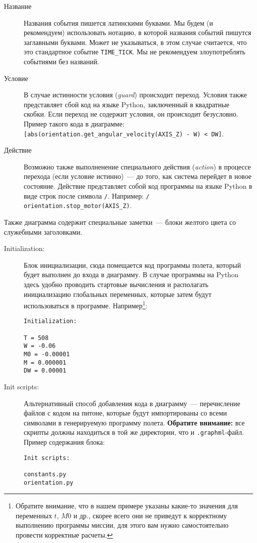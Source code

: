 \documentclass[12pt,a4paper]{article}
\begin{document}
\begin{description}
\item[Название] Названия события пишется латинскими буквами. Мы будем (и рекомендуем)
  использовать нотацию, в которой названия событий пишутся заглавными буквами. Может не
  указываться, в этом случае считается, что это стандартное событие \verb'TIME_TICK'. Мы
  не рекомендуем злоупотреблять событиями без названий.
\item[Условие] В случае истинности условия (\emph{guard}) происходит переход. Условия
  также представляет сбой код на языке Python, заключенный в квадратные скобки. Если
  переход не содержит условия, он происходит безусловно. Пример такого кода в диаграмме:
  \verb'[abs(orientation.get_angular_velocity(AXIS_Z) - W) < DW]'.
\item[Действие] Возможно также выполненение специального действия (\emph{action}) в
  процессе перехода (если условие истинно)~--- до того, как система перейдет в новое
  состояние. Действие представляет собой код программы на языке Python в виде строк после
  символа \verb'/'. Например: \verb'/ orientation.stop_motor(AXIS_Z)'.
\end{description}

Также диаграмма содержит специальные заметки~--- блоки желтого цвета со служебными
заголовками.

\begin{description}
\item[Initialization:] Блок инициализации, сюда помещается код программы полета,
  который будет выполнен до входа в диаграмму. В случае программы на Python здесь удобно
  проводить стартовые вычисления и располагать инициализацию глобальных переменных,
  которые затем будут использоваться в программе. Например\footnote{Обратите внимание, что в нашем
    примере указаны какие-то значения для переменных $t$, $M0$ и др., скорее всего они не
    приведут к корректному выполнению программы миссии, для этого вам нужно самостоятельно
    провести корректные расчеты.}:

\begin{verbatim}
Initialization:

T = 508
W = -0.06
M0 = -0.00001
M = 0.000001
DW = 0.00001
\end{verbatim}

\item[Init scripts:] Альтернативный способ добавления кода в диаграмму~--- перечисление
  файлов с кодом на питоне, которые будут импортированы со всеми символами в генерируемую программу
  полета. \textbf{Обратите внимание:} все скрипты должны находиться в той же директории,
  что и \verb'.graphml'-файл. Пример содержания блока:

\begin{verbatim}
Init scripts:

constants.py
orientation.py
\end{verbatim}

\end{description}
\end{document}
